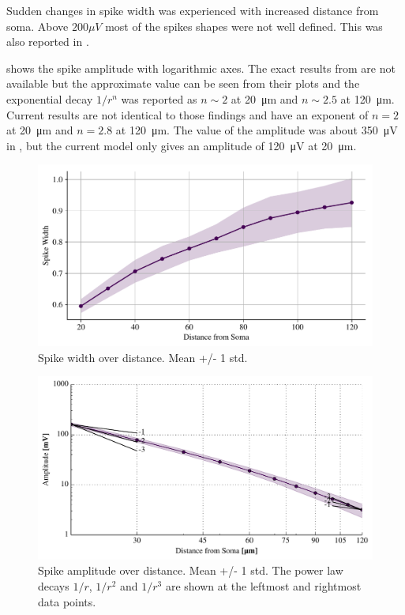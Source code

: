 \documentclass[altfont, fleqn]{uiophd}
\renewcommand{\Cref}[1]{{\color{viridis_03}\myCref{#1}}}
\begin{document}
Sudden changes in spike width was experienced with increased distance from
soma. Above $200\mu V$
most of the spikes shapes were not well defined. 
This was also reported in \textcite{pettersen_amplitude_2008}\@.

\Cref{fig:4_1_spike_amp} shows the spike amplitude with logarithmic axes.  
The exact results from 
\textcite{pettersen_amplitude_2008}
are not available but 
the approximate value can be seen from their plots and
the exponential decay
$1 / r^n$
was reported
as  $n \sim 2$ at \SI{20}{\micro\metre} and 
$n \sim 2.5$ at \SI{120}{\micro\metre}.
Current results are not identical to those findings
and have an exponent 
of $n = 2$ at \SI{20}{\micro\metre}
and $n = 2.8$ at \SI{120}{\micro\metre}.
The value of the amplitude was about
\SI{350}{\micro\volt} in 
\textcite{pettersen_amplitude_2008}, 
but the current model only gives an amplitude of 
\SI{120}{\micro\volt} 
at 
\SI{20}{\micro\metre}.

\begin{figure}[thp]
\centering
\includegraphics[width=\textwidth]{images/sec_4/disc_spike_width_II.pdf}
\caption{Spike width over distance. Mean +/- 1 std.}
\label{fig:4_1_spike_width}
\end{figure}

\begin{figure}[thp]
    \centering
    \includegraphics[width=\textwidth]{images/4_1/disc_spike_amps_I_log.pdf}
    \caption{Spike amplitude over distance. Mean +/- 1 std. The power law
    decays $1/r$, $1/r^2$ and $1/r^3$ are shown at the leftmost and rightmost
    data points.}
    \label{fig:4_1_spike_amp}
\end{figure}
\end{document}
